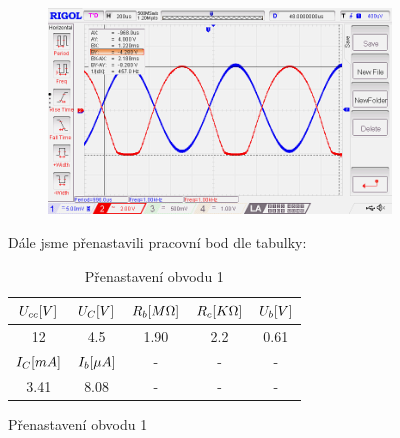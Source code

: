 \documentclass{article}
\begin{document}
\begin{figure}[H]
	\begin{minipage}[t]{0.6\textwidth}
    \vspace{-10mm}
    \begin{figure}[H]
      \includegraphics[width=\textwidth]{LAB/NewFile6.png}
      \caption{\label{obvod_z_laborky}}
    \end{figure}
  \end{minipage}
  \hfill
	\begin{minipage}[t]{0.35\textwidth}
    Dále jsme přenastavili pracovní bod dle tabulky:
    \begin{table}[H]
      \hspace{-5mm}
      \small
      \begin{tabular}{|c|c|c|c|c|} 
        \hline
        \(U_{cc}\-[V]\) & \(U_{C}\-[V]\)  & \(R_b\-[M\Omega]\) & \(R_c\-[K\Omega]\) & \(U_{b}\-[V]\)  \\ \hline
        12              & 4.5             & 1.90               & 2.2                & 0.61            \\ \hline
        \hline
        \(I_{C}\-[mA]\) & \(I_{b}\-[\mu A]\) & - & - & - \\\hline
        3.41            & 8.08               & - & - & - \\\hline
      \end{tabular}
      \normalsize
      \caption{\label{tab_pracovni_bod_rozladeni1} Přenastavení obvodu 1}
    \end{table}
  \end{minipage}
\end{figure}
\end{document}
